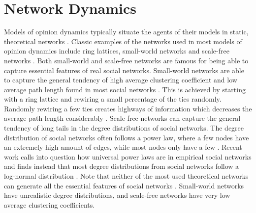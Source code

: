 \documentclass[11pt]{article}
\begin{document}
\section{Network Dynamics}
Models of opinion dynamics typically situate the agents of their models in static, theoretical networks \cite{flache_models_2017, galesic_integrating_2021}. Classic examples of the networks used in most models of opinion dynamics include ring lattices, small-world networks and scale-free networks \cite{barabasi_scale-free_2003,watts_collective_1998}. Both small-world and scale-free networks are famous for being able to capture essential features of real social networks. Small-world networks are able to capture the general tendency of high average clustering coefficient and low average path length found in most social networks \cite{watts_collective_1998}. This is achieved by starting with a ring lattice and rewiring a small percentage of the ties randomly. Randomly rewiring a few ties creates highways of information which decreases the average path length considerably \cite{watts_collective_1998}. Scale-free networks can capture the general tendency of long tails in the degree distributions of social networks. The degree distribution of social networks often follows a power law, where a few nodes have an extremely high amount of edges, while most nodes only have a few \cite{barabasi_scale-free_2003}. Recent work calls into question how universal power laws are in empirical social networks and finds instead that most degree distributions from social networks follow a log-normal distribution \cite{broido_scale-free_2019}. Note that neither of the most used theoretical networks can generate all the essential features of social networks \cite{jacksonsearch2004}. Small-world networks have unrealistic degree distributions, and scale-free networks have very low average clustering coefficients. 
\end{document}
